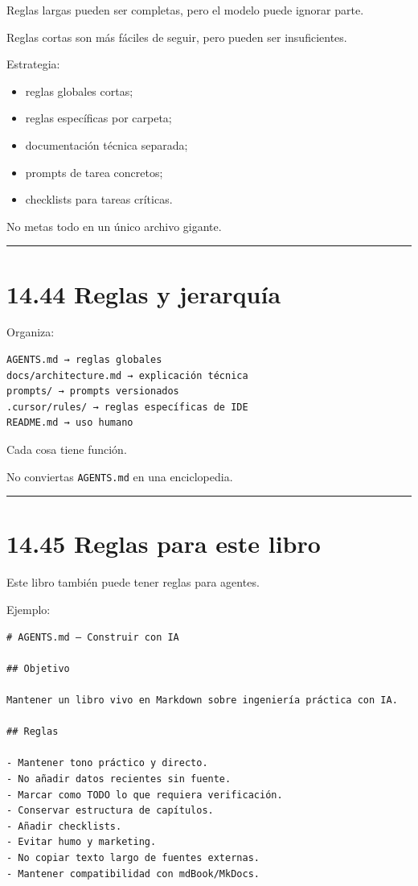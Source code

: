Reglas largas pueden ser completas, pero el modelo puede ignorar parte.

Reglas cortas son más fáciles de seguir, pero pueden ser insuficientes.

Estrategia:

\begin{itemize}
\tightlist
\item
  reglas globales cortas;
\item
  reglas específicas por carpeta;
\item
  documentación técnica separada;
\item
  prompts de tarea concretos;
\item
  checklists para tareas críticas.
\end{itemize}

No metas todo en un único archivo gigante.

\begin{center}\rule{0.5\linewidth}{0.5pt}\end{center}

\section{14.44 Reglas y jerarquía}\label{reglas-y-jerarquuxeda}

Organiza:

\begin{lstlisting}
AGENTS.md → reglas globales
docs/architecture.md → explicación técnica
prompts/ → prompts versionados
.cursor/rules/ → reglas específicas de IDE
README.md → uso humano
\end{lstlisting}

Cada cosa tiene función.

No conviertas \passthrough{\lstinline!AGENTS.md!} en una enciclopedia.

\begin{center}\rule{0.5\linewidth}{0.5pt}\end{center}

\section{14.45 Reglas para este libro}\label{reglas-para-este-libro}

Este libro también puede tener reglas para agentes.

Ejemplo:

\begin{lstlisting}
# AGENTS.md — Construir con IA

## Objetivo

Mantener un libro vivo en Markdown sobre ingeniería práctica con IA.

## Reglas

- Mantener tono práctico y directo.
- No añadir datos recientes sin fuente.
- Marcar como TODO lo que requiera verificación.
- Conservar estructura de capítulos.
- Añadir checklists.
- Evitar humo y marketing.
- No copiar texto largo de fuentes externas.
- Mantener compatibilidad con mdBook/MkDocs.
\end{lstlisting}

